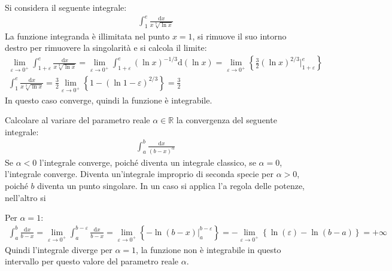 \documentclass{article}
\numberwithin{equation}{subsection}
\begin{document}
Si considera il seguente integrale:
\begin{gather*}
    \displaystyle\int_1^e\frac{\mathrm{d}x}{x\sqrt[3]{\ln x}}
\end{gather*}
La funzione integranda è illimitata nel punto $x=1$, si rimuove il suo intorno destro per rimuovere la singolarità e si calcola il limite:
\begin{gather*}
    \lim_{\varepsilon\to0^+}\displaystyle\int_{1+\varepsilon}^e\frac{\mathrm{d}x}{x\sqrt[3]{\ln x}}=\lim_{\varepsilon\to0^+}\int_{1+\varepsilon}^e(\ln x)^{-1/3}\mathrm{d}\left(\ln x\right)=\lim_{\varepsilon\to0^+}\left\{\frac{3}{2}\left(\ln x\right)^{2/3}\bigg|_{1+\varepsilon}^e\right\}\\
    \displaystyle\int_1^e\frac{\mathrm{d}x}{x\sqrt[3]{\ln x}}=
    \frac{3}{2}\lim_{\varepsilon\to0^+}\left\{1-\left(\ln 1-\varepsilon\right)^{2/3}\right\}=\frac{3}{2}
\end{gather*}
In questo caso converge, quindi la funzione è integrabile. 


Calcolare al variare del parametro reale $\alpha\in\mathbb{R}$ la convergenza del seguente integrale:
\begin{gather*}
\displaystyle\int_a^b\frac{\mathrm{d}x}{(b-x)^\alpha}    
\end{gather*}
Se $\alpha<0$ l'integrale converge, poiché diventa un integrale classico, se $\alpha=0$, l'integrale converge. Diventa un'integrale improprio di seconda specie per $\alpha>0$, poiché $b$ diventa un punto singolare. In un caso si applica l'a regola delle potenze, nell'altro si %

Per $\alpha=1$:
\begin{gather*}
    \displaystyle\int_a^b\frac{\mathrm{d}x}{b-x}=
    \lim_{\varepsilon\to0^+}\displaystyle\int_a^{b-\varepsilon}\frac{\mathrm{d}x}{b-x}=
    \lim_{\varepsilon\to0^+}\left\{-\ln(b-x)\bigg|_a^{b-\varepsilon}\right\}=
    -\lim_{\varepsilon\to0^+}\left\{\ln(\varepsilon)-\ln(b-a)\right\}=+\infty
\end{gather*}
Quindi l'integrale diverge per $\alpha=1$, la funzione non è integrabile in questo intervallo per questo valore del parametro reale $\alpha$.
\end{document}
